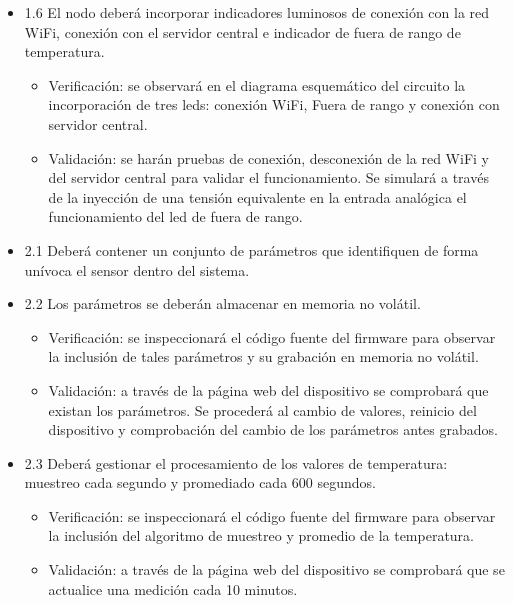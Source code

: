 \documentclass[11pt]{charter}
\begin{document}
\begin{itemize}
\item 1.6 El nodo deberá incorporar indicadores luminosos de conexión con la red WiFi, conexión con el servidor central e indicador de fuera de rango de temperatura.

\begin{itemize}
\item Verificación: se observará en el diagrama esquemático del circuito la incorporación de tres leds: conexión WiFi, Fuera de rango y conexión con servidor central.
\item Validación: se harán pruebas de conexión, desconexión de la red WiFi y del servidor central para validar el funcionamiento. Se simulará a través de la inyección de una tensión equivalente en la entrada analógica el funcionamiento del led de fuera de rango.
\end{itemize}

\item 2.1 Deberá contener un conjunto de parámetros que identifiquen de forma unívoca el sensor dentro del sistema.
\item 2.2 Los parámetros se deberán almacenar en memoria no volátil.


\begin{itemize}
\item Verificación: se inspeccionará el código fuente del firmware para observar la inclusión de tales parámetros y su grabación en memoria no volátil.
\item Validación: a través de la página web del dispositivo se comprobará que existan los parámetros. Se procederá al cambio de valores, reinicio del dispositivo y comprobación del cambio de los parámetros antes grabados.
\end{itemize}

\item 2.3 Deberá gestionar el procesamiento de los valores de temperatura: muestreo cada segundo y promediado cada 600 segundos.
\begin{itemize}
\item Verificación: se inspeccionará el código fuente del firmware para observar la inclusión del algoritmo de muestreo y promedio de la temperatura.
\item Validación: a través de la página web del dispositivo se comprobará que se actualice una medición cada 10 minutos.
\end{itemize}


\end{itemize}
\end{document}
